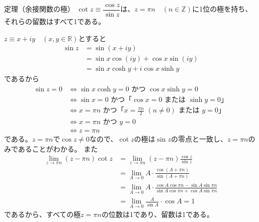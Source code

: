 \documentclass[11pt,b5paper,papersize,dvipdfmx]{jsbook}
\begin{document}
\begin{thm}{定理（余接関数の極）}
  $\cot z \equiv \dfrac{\cos z}{\sin z}$は、$z=\pi n \quad (n \in \mathbb{Z})$に1位の極を持ち、それらの留数はすべて1である。
\end{thm}
\begin{prf}
  $z\equiv x+iy\quad (x,y\in\mathbb{R})$とすると
  \begin{align*}
    \sin z &= \sin(x+iy)\\
    &= \sin x \cos(iy) + \cos x \sin(iy)\\
    &= \sin x \cosh y + i\cos x \sinh y
  \end{align*}
  であるから
  \begin{align*}
    \sin z = 0 
    &\iff \text{$\sin x \cosh y = 0$ かつ $\cos x \sinh y = 0$}\\
    &\iff \text{$\sin x = 0$ かつ「$\cos x = 0$ または $\sinh y = 0$」}\\
    &\iff \text{$x=\pi n$ かつ「$x=\frac{\pi n}{2}\,\,(n\ne 0) $ または $y=0$」}\\
    &\iff \text{$x=\pi n$ かつ $y=0$}\\
    &\iff z = \pi n
  \end{align*}
  である。$z = \pi n$で$\cos z \ne 0$なので、$\cot z$の極は$\sin z$の零点と一致し、$z = \pi n$のみであることがわかる。
  また
  \begin{align*}
    \lim_{z\to\pi n} (z-\pi n)\cot z
    &= \lim_{z\to\pi n} (z-\pi n) \frac{\cos z}{\sin z}\\
    &= \lim_{A \to 0} A\cdot\frac{\cos(A+\pi n)}{\sin(A+\pi n)}\\
    &= \lim_{A \to 0} A\cdot\frac{\cos{A}\cos{\pi n} - \sin{A}\sin{\pi n} }{\sin{A}\cos{\pi n} + \cos{A}\sin{\pi n} }\\
    &= \lim_{A \to 0} \frac{A}{\sin A} \cdot \cos A = 1
  \end{align*}
  であるから、すべての極$z=\pi n$の位数は1であり、留数は1である。
\end{prf}
\end{document}
